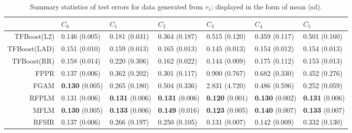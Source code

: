 \renewcommand{\arraystretch}{1.5}
\addtolength{\tabcolsep}{-3pt}    

\begin{table}[H]
\centering
\footnotesize
\begin{tabular}{rllllll}
  \hline
 & $C_0$ & $C_1$ & $C_2$ & $C_3$ & $C_4$ & $C_5$ \\ 
  \hline
TFBoost(L2) & 0.146 (0.005) & 0.181 (0.031) & 0.364 (0.187) & 0.515 (0.120) & 0.359 (0.117) & 0.501 (0.160) \\ 
  TFBoost(LAD) & 0.151 (0.010) & 0.159 (0.013) & 0.165 (0.013) & 0.145 (0.013) & 0.154 (0.012) & 0.154 (0.013) \\ 
  TFBoost(RR) & 0.158 (0.014) & 0.220 (0.306) & 0.162 (0.022) & 0.144 (0.009) & 0.175 (0.112) & 0.153 (0.013) \\ 
  FPPR & 0.137 (0.006) & 0.362 (0.202) & 0.301 (0.117) & 0.900 (0.767) & 0.682 (0.330) & 0.452 (0.276) \\ 
  FGAM & \textbf{0.130} (0.005) & 0.265 (0.180) & 0.504 (0.336) & 2.831 (4.720) & 0.486 (0.596) & 0.252 (0.059) \\ 
  RFPLM & 0.131 (0.006) & \textbf{0.131} (0.006) & \textbf{0.131} (0.006) & \textbf{0.120} (0.001) & \textbf{0.130} (0.002) & \textbf{0.131} (0.006) \\ 
  MFLM & \textbf{0.130} (0.005) & \textbf{0.133} (0.006) & \textbf{0.149} (0.016) & \textbf{0.123} (0.005) & \textbf{0.140} (0.007) & \textbf{0.133} (0.007) \\ 
  RFSIR & 0.137 (0.006) & 0.266 (0.197) & 0.250 (0.105) & 0.131 (0.007) & 0.142 (0.009) & 0.332 (0.130) \\ 
   \hline
\end{tabular}
\caption{Summary statistics of test errors for data generated from $r_1$; displayed in the form of mean (sd).} 
\end{table}
